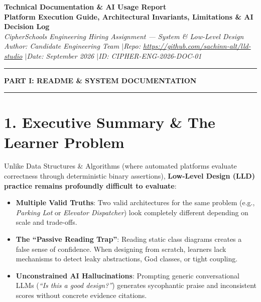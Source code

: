 \documentclass[10pt,a4paper]{article}
\begin{document}
{\LARGE \textbf{\color{primary}Technical Documentation \& AI Usage Report}}\\[0.2em]
\textbf{Platform Execution Guide, Architectural Invariants, Limitations \& AI Decision Log}\\
\textit{CipherSchools Engineering Hiring Assignment --- System \& Low-Level Design}\\
\textit{Author: Candidate Engineering Team \quad$\vert$\quad Repo: \url{https://github.com/sachinn-alt/lld-studio} \quad$\vert$\quad Date: September 2026 \quad$\vert$\quad ID: CIPHER-ENG-2026-DOC-01}
\vspace{-0.4em}\rule{\textwidth}{1.2pt}\vspace{-0.2em}

\vspace{0.8em}
{\Large \textbf{\color{secondary}PART I: README \& SYSTEM DOCUMENTATION}}
\vspace{0.2em}\rule{\textwidth}{0.8pt}

\section{1. Executive Summary \& The Learner Problem}

Unlike Data Structures \& Algorithms (where automated platforms evaluate correctness through deterministic binary assertions), \textbf{Low-Level Design (LLD) practice remains profoundly difficult to evaluate}:
\begin{itemize}
  \item \textbf{Multiple Valid Truths}: Two valid architectures for the same problem (e.g., \textit{Parking Lot} or \textit{Elevator Dispatcher}) look completely different depending on scale and trade-offs.
  \item \textbf{The ``Passive Reading Trap''}: Reading static class diagrams creates a false sense of confidence. When designing from scratch, learners lack mechanisms to detect leaky abstractions, God classes, or tight coupling.
  \item \textbf{Unconstrained AI Hallucinations}: Prompting generic conversational LLMs (\textit{``Is this a good design?''}) generates sycophantic praise and inconsistent scores without concrete evidence citations.
\end{itemize}
\end{document}
